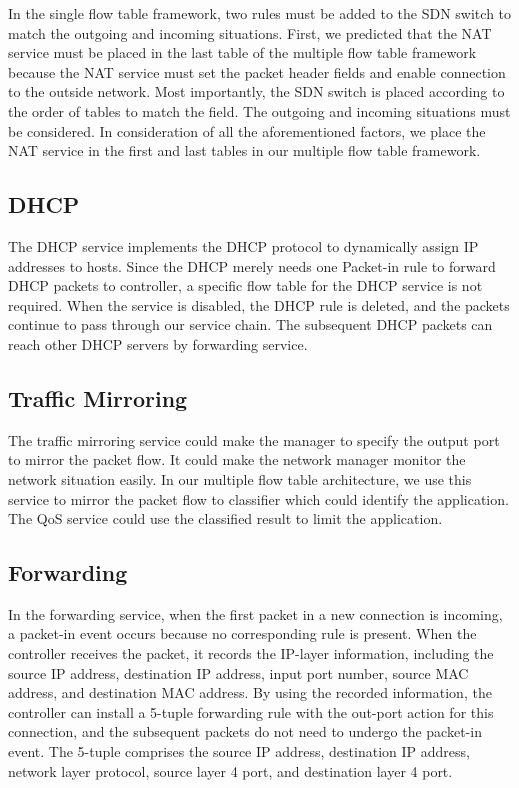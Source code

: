 \documentclass[conference]{IEEEtran}
\begin{document}
In the single flow table framework, two rules must be added to the SDN switch to match the outgoing and incoming situations.
First, we predicted that the NAT service must be placed in the last table of the multiple flow table framework because the NAT service must set the packet header fields and enable connection to the outside network.
Most importantly, the SDN switch is placed according to the order of tables to match the field.
The outgoing and incoming situations must be considered.
In consideration of all the aforementioned factors, we place the NAT service in the first and last tables in our multiple flow table framework.



\subsection{DHCP}
The DHCP service implements the DHCP protocol to dynamically assign IP addresses to hosts.
Since the DHCP merely needs one Packet-in rule to forward DHCP packets to controller, a specific flow table for the DHCP service is not required.
When the service is disabled, the DHCP rule is deleted, and the packets continue to pass through our service chain.
The subsequent DHCP packets can reach other DHCP servers by forwarding service.



\subsection{Traffic Mirroring} \label{ssec:mirror}
The traffic mirroring service could make the manager to specify the output port to mirror the packet flow.
It could make the network manager monitor the network situation easily.
In our multiple flow table architecture, we use this service to mirror the packet flow to classifier which could identify the application.
The QoS service could use the classified result to limit the application.



\subsection{Forwarding} \label{ssec:forwarding}
In the forwarding service, when the first packet in a new connection is incoming, a packet-in event occurs because no corresponding rule is present.
When the controller receives the packet, it records the IP-layer information, including the source IP address, destination IP address, input port number, source MAC address, and destination MAC address.
By using the recorded information, the controller can install a 5-tuple forwarding rule with the out-port action for this connection, and the subsequent packets do not need to undergo the packet-in event.
The 5-tuple comprises the source IP address, destination IP address, network layer protocol, source layer 4 port, and destination layer 4 port.
\end{document}
